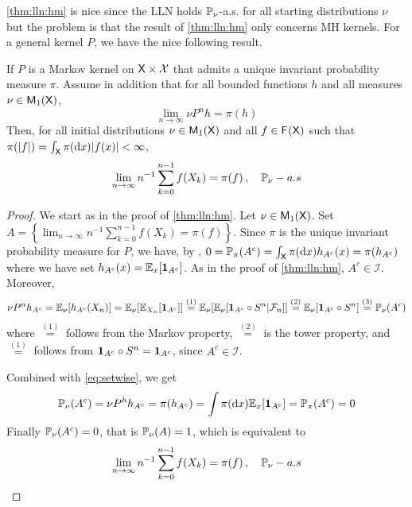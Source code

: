 \documentclass[english,graybox,envcountchap,envcountsame,sectrefs,shortlabels]{svmono}
\theoremstyle{style}
\newenvironment{svmultproof}{\small \begin{proof}}{\end{proof}}
\begin{document}
\autoref{thm:lln:hm} is nice since the LLN holds $\mathbb{P}_\nu$-a.s. for all starting distributions $\nu$ but the problem is that the result of \autoref{thm:lln:hm} only concerns MH kernels. For a general kernel $P$, we have the nice following result.

\begin{shaded}
\begin{theorem}
If $P$ is a Markov kernel on $\mathsf{X} \times\mathcal{X}$ that admits a unique invariant probability measure $\pi$. Assume in addition that for all bounded functions $h$ and all measures $\nu\in\mathsf{M}_{1}(\mathsf{X})$,
\begin{equation}
\label{eq:setwise}
\lim_{n \to \infty}  \nu P^n h=\pi(h)
\end{equation}
Then, for all initial
distributions $\nu\in\mathsf{M}_{1}(\mathsf{X})$ and all $f\in\mathsf{F_{}}(\mathsf{X})$
such that $\pi(|f|)=\int_{\mathsf{X}}\pi(\mathrm{d} x)|f(x)|<\infty$,
\begin{equation}
\lim_{n\to\infty}n^{-1}\sum_{k=0}^{n-1}f(X_{k})=\pi(f)\,,\quad\mathbb{P}_{\nu}-a.s\label{eq:LLN:gener}
\end{equation}
\end{theorem}

\end{shaded}

\begin{svmultproof}
We start as in the proof of \autoref{thm:lln:hm}.
Let $\nu\in\mathsf{M}_{1}(\mathsf{X})$. Set $A=\left\{ \lim_{n\to\infty}n^{-1}\sum_{k=0}^{n-1}f(X_{k})=\pi(f)\right\} $.
Since $\pi$ is the unique invariant
probability measure for $P$, we have, by ,
$0=\mathbb{P}_{\pi}(A^{c})=\int_{\mathsf{X}}\pi(\mathrm{d} x)h_{A^{c}}(x)=\pi(h_{A^{c}})$
where we have set $h_{A^{c}}(x)=\mathbb{E}_{x}[\mathbf{1}_{A^{c}}]$. As in the proof of \autoref{thm:lln:hm}, $A^c\in {\mathcal I}$. Moreover, $$
\nu P^n h_{A^{c}}=\mathbb{E}_\nu[h_{A^{c}}(X_n)]=\mathbb{E}_\nu[\mathbb{E}_{X_n}[\mathbf{1}_{A^{c}}]]\stackrel{(1)}{=}\mathbb{E}_\nu[\mathbb{E}_{\nu}[\mathbf{1}_{A^{c}}\circ S^n|\mathcal{F}_n]]\stackrel{(2)}{=}\mathbb{E}_{\nu}[\mathbf{1}_{A^{c}}\circ S^n]\stackrel{(3)}{=}\mathbb{P}_\nu(A^c)
$$
where $\stackrel{(1)}{=}$ follows from the Markov property, $\stackrel{(2)}{=}$ is the tower property, and $\stackrel{(1)}{=}$ follows from $\mathbf{1}_{A^{c}}\circ S^n=\mathbf{1}_{A^{c}}$, since $A^c\in {\mathcal I}$.

Combined with \eqref{eq:setwise}, we get
$$
\mathbb{P}_\nu(A^c)=\nu P^h h_{A^{c}}=\pi(h_{A^c})=\int \pi(\mathrm{d} x) \mathbb{E}_x[\mathbf{1}_{A^c}]=\mathbb{P}_\pi(A^c)=0
$$
Finally $\mathbb{P}_\nu(A^c)=0$, that is $\mathbb{P}_\nu(A)=1$, which is equivalent to
$$
\lim_{n\to\infty}n^{-1}\sum_{k=0}^{n-1}f(X_{k})=\pi(f)\,,\quad\mathbb{P}_{\nu}-a.s
$$
\end{svmultproof}
\end{document}
